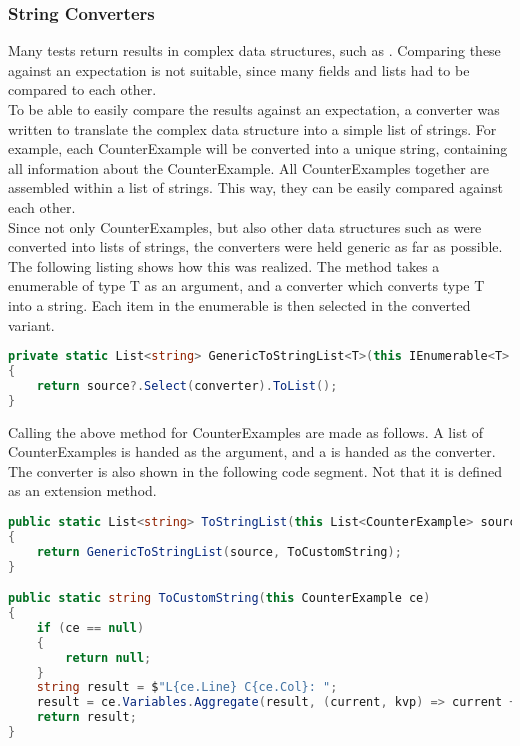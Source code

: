 {{\subsubsection{String Converters}
Many tests return results in complex data structures, such as .
Comparing these against an expectation is not suitable, since many fields and lists had to be compared to each other.\\
To be able to easily compare the results against an expectation, a converter was written to translate the complex data structure into a simple list of strings.
For example, each CounterExample will be converted into a unique string, containing all information about the CounterExample.
All CounterExamples together are assembled within a list of strings.
This way, they can be easily compared against each other.\\
Since not only CounterExamples, but also other data structures such as  were converted into lists of strings, the converters were held generic as far as possible.
The following listing shows how this was realized.
The method takes a enumerable of type T as an argument, and a converter which converts type T into a string.
Each item in the enumerable is then selected in the converted variant.

\begin{lstlisting}[language=csharp, caption={Generic Method to Convert an IEnumerable}, captionpos=b, label={lst:genericconverter}]
private static List<string> GenericToStringList<T>(this IEnumerable<T> source, Func<T, string> converter)
{
    return source?.Select(converter).ToList();
}
\end{lstlisting}

Calling the above method for CounterExamples are made as follows.
A list of CounterExamples is handed as the argument, and a  is handed as the converter.
The converter is also shown in the following code segment.
Not that it is defined as an extension method.

\begin{lstlisting}[language=csharp, caption={Converting CounterExamples to strings}, captionpos=b, label={lst:converterCEToString}]
public static List<string> ToStringList(this List<CounterExample> source)
{
    return GenericToStringList(source, ToCustomString);
}

public static string ToCustomString(this CounterExample ce)
{
    if (ce == null)
    {
        return null;
    }
    string result = $"L{ce.Line} C{ce.Col}: ";
    result = ce.Variables.Aggregate(result, (current, kvp) => current + $"{kvp.Key} = {kvp.Value}; ");
    return result;
}
\end{lstlisting}

}}
